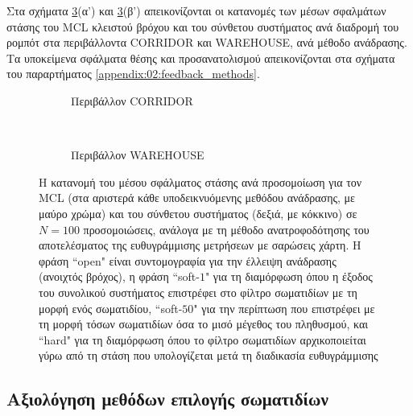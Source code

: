 Στα σχήματα \ref{fig:02_02_04:feedbacks}(α') και
\ref{fig:02_02_04:feedbacks}(β') απεικονίζονται οι κατανομές των μέσων
σφαλμάτων στάσης του MCL κλειστού βρόχου και του σύνθετου συστήματος ανά
διαδρομή του ρομπότ στα περιβάλλοντα CORRIDOR και WAREHOUSE, ανά μέθοδο
ανάδρασης. Τα υποκείμενα σφάλματα θέσης και προσανατολισμού απεικονίζονται στα
σχήματα του παραρτήματος \ref{appendix:02:feedback_methods}.

\begin{figure}
  \vspace{2cm}
  \begin{subfigure}{\linewidth}
  \hspace{-1.25cm}
    
    \vspace{0.3cm}
    \caption{Περιβάλλον CORRIDOR}
    \label{}
  \end{subfigure}\\
  \begin{subfigure}{\linewidth}\vspace{0.5cm}
    \hspace{-1.25cm}
    
    \vspace{0.3cm}
    \caption{Περιβάλλον WAREHOUSE}
    \label{}
    \end{subfigure}
\caption{\small Η κατανομή του μέσου σφάλματος στάσης ανά προσομοίωση για τον
         MCL (στα αριστερά κάθε υποδεικνυόμενης μεθόδου ανάδρασης, με μαύρο
         χρώμα) και του σύνθετου συστήματος (δεξιά, με κόκκινο) σε $N=100$
         προσομοιώσεις, ανάλογα με τη μέθοδο ανατροφοδότησης του αποτελέσματος
         της ευθυγράμμισης μετρήσεων με σαρώσεις χάρτη. Η φράση ``open" είναι
         συντομογραφία για την έλλειψη ανάδρασης (ανοιχτός βρόχος), η φράση
         ``soft-$1$" για τη διαμόρφωση όπου η έξοδος του συνολικού συστήματος
         επιστρέφει στο φίλτρο σωματιδίων με τη μορφή ενός σωματιδίου,
         ``soft-$50$" για την περίπτωση που επιστρέφει με τη μορφή τόσων
         σωματιδίων όσα το μισό μέγεθος του πληθυσμού, και ``hard" για τη
         διαμόρφωση όπου το φίλτρο σωματιδίων αρχικοποιείται γύρω από τη στάση
         που υπολογίζεται μετά τη διαδικασία ευθυγράμμισης}
\label{fig:02_02_04:feedbacks}
\end{figure}


\subsection{Αξιολόγηση μεθόδων επιλογής σωματιδίων}

